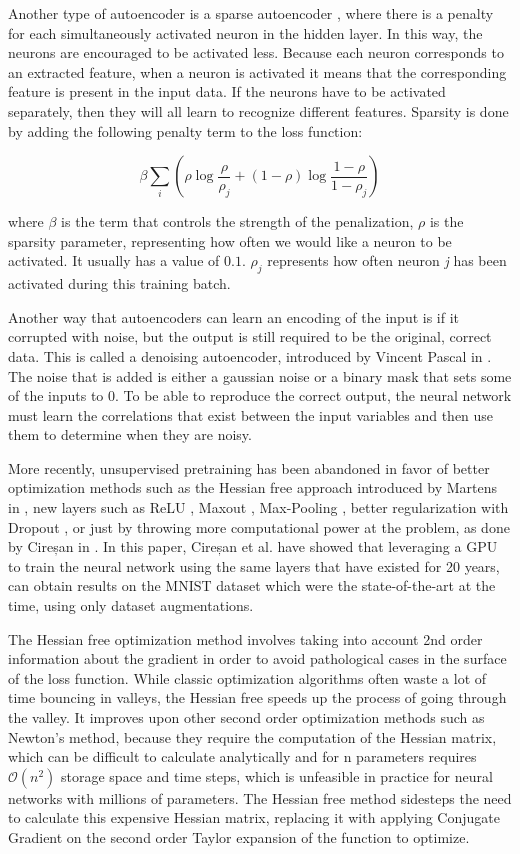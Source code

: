 Another type of autoencoder is a sparse autoencoder \cite{hinton2010practical}, where there is a penalty for each simultaneously activated neuron in the hidden layer. In this way, the neurons are encouraged to be activated less. Because each neuron corresponds to an extracted feature, when a neuron is activated it means that the corresponding feature is present in the input data. If the neurons have to be activated separately, then they will all learn to recognize different features. Sparsity is done by adding the following penalty term to the loss function:

\[
	\beta \sum_i ( \rho \log \frac{\rho}{\rho_j} + (1-\rho) \log \frac{1-\rho}{1-\rho_j})
\]

where $\beta $ is the term that controls the strength of the penalization, $\rho$ is the sparsity parameter, representing how often we would like a neuron to be activated. It usually has a value of $ 0.1 $. $\rho_j$ represents how often neuron \textit{j} has been activated during this training batch. 

Another way that autoencoders can learn an encoding of the input is if it corrupted with noise, but the output is still required to be the original, correct data. This is called a denoising autoencoder, introduced by Vincent Pascal in \cite{vincent2008extracting}. The noise that is added is either a gaussian noise or a binary mask that sets some of the inputs to 0. To be able to reproduce the correct output, the neural network must learn the correlations that exist between the input variables and then use them to determine when they are noisy.  

More recently, unsupervised pretraining has been abandoned in favor of better optimization methods such as the Hessian free approach introduced by Martens in \cite{martens2010deep}, new layers such as ReLU \cite{nair2010rectified}, Maxout \cite{goodfellow2013maxout}, Max-Pooling \cite{scherer2010evaluation}, better regularization with Dropout  \cite{hinton2012improving}, or just by throwing more computational power at the problem, as done by Cireșan in \cite{Cire_an_2010}. In this paper, Cireșan et al. have showed that  leveraging a GPU to train the neural network using the same layers that have existed for 20 years, can obtain results on the MNIST dataset which were the state-of-the-art at the time, using only dataset augmentations. 

The Hessian free optimization method involves taking into account 2nd order information about the gradient in order to avoid pathological cases in the surface of the loss function. While classic optimization algorithms often waste a lot of time bouncing in valleys, the Hessian free speeds up the process of going through the valley. It improves upon other second order optimization methods such as Newton's method, because they require the computation of the Hessian matrix, which can be difficult to calculate analytically and for n parameters requires $ \mathcal{O}(n^2) $ storage space and time steps, which is unfeasible in practice for neural networks with millions of parameters. The Hessian free method sidesteps the need to calculate this expensive Hessian matrix, replacing it with applying Conjugate Gradient on the second order Taylor expansion of the function to optimize. 

